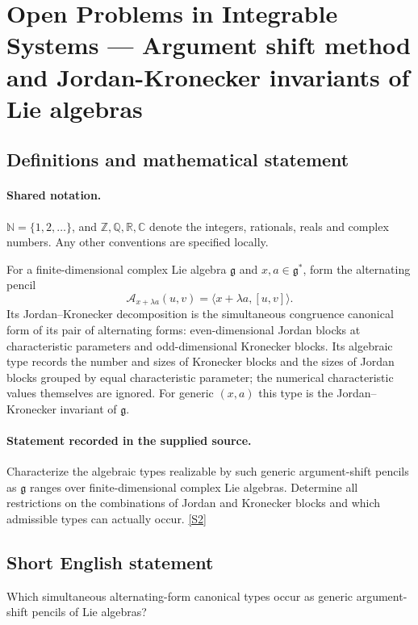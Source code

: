 \documentclass[11pt]{article}
\newcommand{\sref}[2]{\hyperlink{source:#1:#2}{[S#2]}}
\begin{document}
\section{Open Problems in Integrable Systems — Argument shift method and Jordan-Kronecker invariants of Lie algebras}\label{statement}

\subsection{Definitions and mathematical statement}

\paragraph{Shared notation.}$\mathbb N=\{1,2,\ldots\}$, and $\mathbb Z,\mathbb Q,\mathbb R,\mathbb C$ denote the integers, rationals, reals and complex numbers. Any other conventions are specified locally.


For a finite-dimensional complex Lie algebra $\mathfrak g$ and $x,a\in\mathfrak g^*$, form the alternating pencil \[\mathcal A_{x+\lambda a}(u,v)=\langle x+\lambda a,[u,v]\rangle.\] Its Jordan--Kronecker decomposition is the simultaneous congruence canonical form of its pair of alternating forms: even-dimensional Jordan blocks at characteristic parameters and odd-dimensional Kronecker blocks. Its algebraic type records the number and sizes of Kronecker blocks and the sizes of Jordan blocks grouped by equal characteristic parameter; the numerical characteristic values themselves are ignored. For generic $(x,a)$ this type is the Jordan--Kronecker invariant of $\mathfrak g$.
\paragraph{Statement recorded in the supplied source.}
Characterize the algebraic types realizable by such generic argument-shift pencils as $\mathfrak g$ ranges over finite-dimensional complex Lie algebras. Determine all restrictions on the combinations of Jordan and Kronecker blocks and which admissible types can actually occur. \sref{statement}{2}
\subsection{Short English statement}
Which simultaneous alternating-form canonical types occur as generic argument-shift pencils of Lie algebras?
\end{document}
